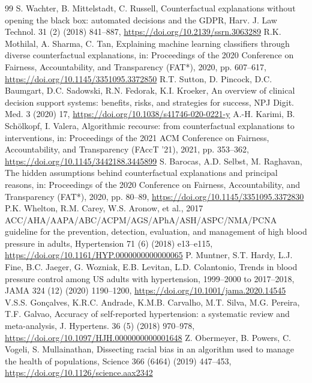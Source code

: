 \documentclass[final,5p,times,twocolumn]{elsarticle}
\begin{document}
\begin{thebibliography}{99}
 S. Wachter, B. Mittelstadt, C. Russell, Counterfactual explanations without opening the black box: automated decisions and the GDPR, Harv. J. Law Technol. 31 (2) (2018) 841–887, \url{https://doi.org/10.2139/ssrn.3063289}
 R.K. Mothilal, A. Sharma, C. Tan, Explaining machine learning classifiers through diverse counterfactual explanations, in: Proceedings of the 2020 Conference on Fairness, Accountability, and Transparency (FAT*), 2020, pp. 607–617, \url{https://doi.org/10.1145/3351095.3372850}
 R.T. Sutton, D. Pincock, D.C. Baumgart, D.C. Sadowski, R.N. Fedorak, K.I. Kroeker, An overview of clinical decision support systems: benefits, risks, and strategies for success, NPJ Digit. Med. 3 (2020) 17, \url{https://doi.org/10.1038/s41746-020-0221-y}
 A.-H. Karimi, B. Schölkopf, I. Valera, Algorithmic recourse: from counterfactual explanations to interventions, in: Proceedings of the 2021 ACM Conference on Fairness, Accountability, and Transparency (FAccT '21), 2021, pp. 353–362, \url{https://doi.org/10.1145/3442188.3445899}
 S. Barocas, A.D. Selbst, M. Raghavan, The hidden assumptions behind counterfactual explanations and principal reasons, in: Proceedings of the 2020 Conference on Fairness, Accountability, and Transparency (FAT*), 2020, pp. 80–89, \url{https://doi.org/10.1145/3351095.3372830}
 P.K. Whelton, R.M. Carey, W.S. Aronow, et al., 2017 ACC/\allowbreak{}AHA/\allowbreak{}AAPA/\allowbreak{}ABC/\allowbreak{}ACPM/\allowbreak{}AGS/\allowbreak{}APhA/\allowbreak{}ASH/\allowbreak{}ASPC/\allowbreak{}NMA/\allowbreak{}PCNA guideline for the prevention, detection, evaluation, and management of high blood pressure in adults, Hypertension 71 (6) (2018) e13–e115, \url{https://doi.org/10.1161/HYP.0000000000000065}
 P. Muntner, S.T. Hardy, L.J. Fine, B.C. Jaeger, G. Wozniak, E.B. Levitan, L.D. Colantonio, Trends in blood pressure control among US adults with hypertension, 1999–2000 to 2017–2018, JAMA 324 (12) (2020) 1190–1200, \url{https://doi.org/10.1001/jama.2020.14545}
 V.S.S. Gonçalves, K.R.C. Andrade, K.M.B. Carvalho, M.T. Silva, M.G. Pereira, T.F. Galvao, Accuracy of self-reported hypertension: a systematic review and meta-analysis, J. Hypertens. 36 (5) (2018) 970–978, \url{https://doi.org/10.1097/HJH.0000000000001648}
 Z. Obermeyer, B. Powers, C. Vogeli, S. Mullainathan, Dissecting racial bias in an algorithm used to manage the health of populations, Science 366 (6464) (2019) 447–453, \url{https://doi.org/10.1126/science.aax2342}

\end{thebibliography}
\end{document}
